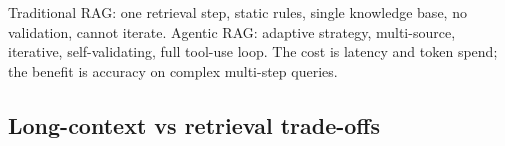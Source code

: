 \begin{intuitionbox}[title=Traditional RAG vs Agentic RAG]
  Traditional RAG: one retrieval step, static rules, single knowledge base, no
  validation, cannot iterate. Agentic RAG: adaptive strategy, multi-source, iterative,
  self-validating, full tool-use loop. The cost is latency and token spend; the benefit
  is accuracy on complex multi-step queries.
\end{intuitionbox}

\subsection{Long-context vs retrieval trade-offs}


